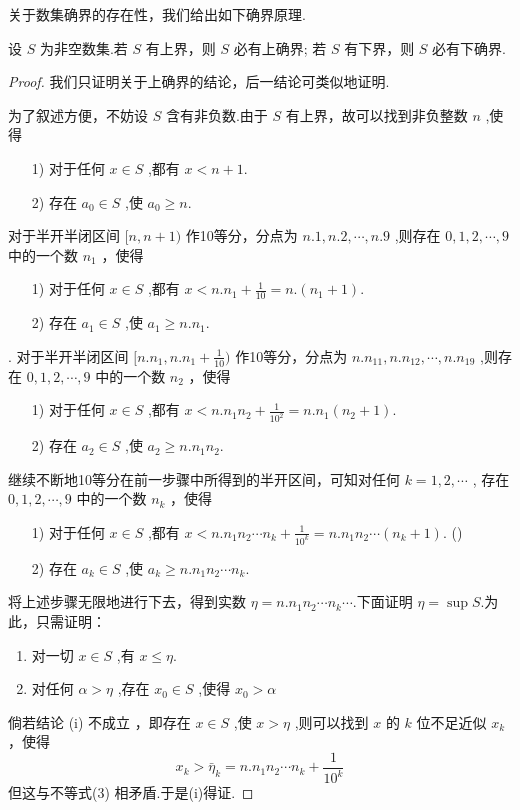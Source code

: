 关于数集确界的存在性，我们给出如下确界原理.

\begin{theorem}[确界原理]
    设 $S$ 为非空数集.若 $S$ 有上界，则 $S$ 必有上确界; 若 $S$ 有下界，则 $S$ 必有下确界.
\end{theorem}

\begin{proof}
    \renewcommand{\theenumi}{\roman{enumi}}
    \renewcommand{\labelenumi}{\normalfont (\theenumi)}
    我们只证明关于上确界的结论，后一结论可类似地证明.

    为了叙述方便，不妨设 $S$ 含有非负数.由于 $S$ 有上界，故可以找到非负整数 $n$ ,使得
    \begin{enumerate}
        \item[1)] 对于任何 $x\in S$ ,都有 $x<n+1$.
        \item[2)] 存在 $a_0\in S$ ,使 $a_0\ge n$.
    \end{enumerate}
    对于半开半闭区间 $[n,n+1)$ 作10等分，分点为 $n.1,n.2,\cdots,n.9$ ,则存在 $0,1,2,\cdots,9$ 中的一个数 $n_1$ ，使得 
    \begin{enumerate}
        \item[1)] 对于任何 $x\in S$ ,都有 $x<n.n_1+\frac{1}{10}=n.(n_1+1)$.
        \item[2)] 存在 $a_1\in S$ ,使 $a_1\ge n.n_1$.
    \end{enumerate}.
    对于半开半闭区间 $[n.n_1,n.n_1+\frac{1}{10})$ 作10等分，分点为 $n.n_11,n.n_12,\cdots,n.n_19$ ,则存在 $0,1,2,\cdots,9$ 中的一个数 $n_2$ ，使得 
    \begin{enumerate}
        \item[1)] 对于任何 $x\in S$ ,都有 $x<n.n_1n_2+\frac{1}{10^2}=n.n_1(n_2+1)$.
        \item[2)] 存在 $a_2\in S$ ,使 $a_2\ge n.n_1n_2$.
    \end{enumerate}
    继续不断地10等分在前一步骤中所得到的半开区间，可知对任何 $k=1,2,\cdots$ ,
    存在 $0,1,2,\cdots,9$ 中的一个数 $n_k$ ，使得 
    \begin{enumerate}
        \item[1)] 对于任何 $x\in S$ ,都有 $x<n.n_1n_2\cdots n_k+\frac{1}{10^k}=n.n_1n_2\cdots(n_k+1)$. \hfill (\theequation)
        \item[2)] 存在 $a_k\in S$ ,使 $a_k\ge n.n_1n_2\cdots n_k$.
    \end{enumerate}
    
    将上述步骤无限地进行下去，得到实数 $\eta=n.n_1n_2\cdots n_k\cdots$.下面证明 $\eta=\sup S$.为此，只需证明：
    \begin{enumerate}
        \item 对一切 $x\in S$ ,有 $x\le \eta$.
        \item 对任何 $\alpha>\eta$ ,存在 $x_0\in S$ ,使得 $x_0> \alpha$
    \end{enumerate}
    倘若结论 (i) 不成立 ，即存在 $x\in S$ ,使 $x>\eta$ ,则可以找到 $x$ 的 $k$ 位不足近似 $x_k$ ，使得
    \[
    x_k > \bar \eta_k = n.n_1n_2\cdots n_k+\frac{1}{10^k}
    \]
    但这与不等式(3) 相矛盾.于是(i)得证.


\end{proof}
